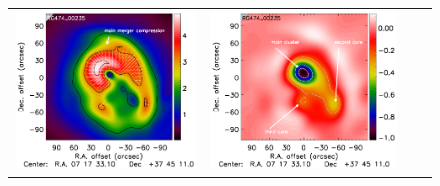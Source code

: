 \documentclass[twocolumn,traditabstract]{aa}
\begin{document}
\begin{figure}[h]
{\begin{tabular}{llll}
\includegraphics[trim=2.3cm 0.7cm 0.0cm 0cm, clip=true, scale=1]{Figure/Grad_RG474_00235_Ymap_zobs0p4_regrid_15_15_45.pdf} & 
\includegraphics[trim=2.3cm 0.7cm 0.0cm 0cm, clip=true, scale=1]{Figure/DoG_RG474_00235_Ymap_zobs0p4_regrid_15_15_45.pdf} \\
\end{tabular}}

\end{figure}
\end{document}
